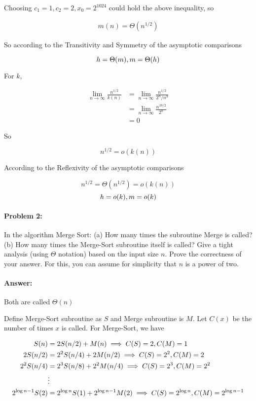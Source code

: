 \documentclass{article}
\begin{document}
Choosing $c_1=1, c_2=2, x_0=2^{1024}$ could hold the above inequality, so

$$\begin{aligned}
m(n)=\Theta(n^{1/2})
\end{aligned}$$

So according to the Transitivity and Symmetry of the asymptotic comparisons

$$ h = \Theta(m),\space m = \Theta(h) $$

For $k$,

$$\begin{aligned}
\lim\limits_{n\rightarrow\infty}\frac{n^{1/2}}{k(n)}&=\lim\limits_{n\rightarrow\infty}\frac{n^{1/2}}{2^n/n^9}\\
&=\lim\limits_{n\rightarrow\infty}\frac{n^{19/2}}{2^n}\\
&=0
\end{aligned}$$

So

$$ n^{1/2}=o(k(n)) $$

According to the Reflexivity of the asymptotic comparisons

$$ n^{1/2}=\Theta(n^{1/2})=o(k(n)) $$
$$ h=o(k), \space m=o(k) $$

\newpage
\paragraph{Problem 2:} 
In the algorithm Merge Sort: (a) How many times the subroutine Merge is called? (b) How many times the Merge-Sort subroutine itself is called? Give a tight analysis (using $\Theta$ notation) based on the input size $n$. Prove the correctness of your answer. For this, you can assume for simplicity that $n$ is a power of two.



\paragraph{Answer:}

Both are called $\Theta(n)$

Define Merge-Sort subroutine as $S$ and Merge subroutine is $M$. Let $C(x)$ be the number of times $x$ is called. For Merge-Sort, we have

$$\begin{aligned}
S(n)&=2S(n/2)+M(n) \space\implies\space C(S)=2, C(M)=1\\
2S(n/2)&=2^2S(n/4)+2M(n/2) \space\implies\space C(S)=2^2, C(M)=2\\
2^2S(n/4)&=2^3S(n/8)+2^2M(n/4) \space\implies\space C(S)=2^3, C(M)=2^2\\
&\vdots\\
2^{{\log n}-1}S(2)&=2^{\log n}S(1)+2^{{\log n}-1}M(2) \space\implies\space C(S)=2^{\log n}, C(M)=2^{{\log n}-1}
\end{aligned}$$
\end{document}
